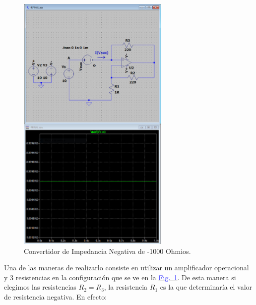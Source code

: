 \documentclass[12pt,a4paper]{report} %
\newcommand{\fref}[1]{\hyperref[#1]{\textcolor{blue}{Fig.~\ref*{#1}}}}
\newcommand{\fref}[1]{\hyperref[#1]{\textcolor{blue}{\textit{Fig.~\ref*{#1}}}}}
\begin{document}
	\vspace{0.5cm}\begin{figure}[h]
		\centering
		\includegraphics[width=0.65\textwidth]{NIC_B.jpg}
		\caption{Convertidor de Impedancia Negativa de -1000 Ohmios.}
		\label{fig:NIC}
	\end{figure}\smallskip
	
	\newpage
	
	Una de las maneras de realizarlo consiste en utilizar un amplificador operacional y 3 resistencias en la configuración que se ve en la \fref{fig:NIC}. De esta manera si elegimos las resistencias $R_2=R_3$, la resistencia $R_1$ es la que determinaría el valor de resistencia negativa. En efecto:
	
	\vspace{0.5cm}
	
\end{document}
